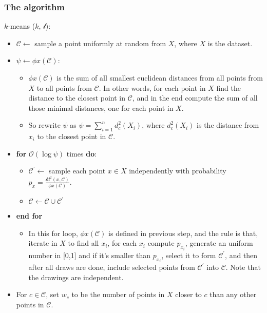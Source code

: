 \documentclass{article}
\begin{document}
\subsubsection{The algorithm}\label{the-algorithm}

$k$-means\textbar{}\textbar{} ($k$, $\mathscr{l}$):

\begin{itemize}
\itemsep1pt\parskip0pt
\item
  $\mathcal{C} \leftarrow$ sample a point uniformly at random from $X$,
  where $X$ is the dataset.
\item
  $\psi \leftarrow \phi x (\mathcal{C})$:

  \begin{itemize}
  \itemsep1pt\parskip0pt
  \item
    $\phi x (\mathcal{C})$ is the sum of all smallest euclidean
    distances from all points from $X$ to all points from $\mathcal{C}$.
    In other words, for each point in $X$ find the distance to the
    closest point in $\mathcal{C}$, and in the end compute the sum of
    all those minimal distances, one for each point in $X$.
  \item
    So rewrite $\psi$ as $\psi = \sum_{i = 1}^{n}d_{c}^{2}(X_{i})$,
    where $d_{c}^{2}(X_{i})$ is the distance from $x_{i}$ to the closest
    point in $\mathcal{C}$.
  \end{itemize}
\item
  \textbf{for} $\mathcal{O}(\log \psi)$ times \textbf{do}:

  \begin{itemize}
  \itemsep1pt\parskip0pt
  \item
    $\mathcal{C}^{'} \leftarrow$ sample each point $x \in X$
    independently with probability
    $p_{x} = \frac{\mathscr{l} d^{2}(x, \mathcal{C})}{\phi x (\mathcal{C})}$.
  \item
    $\mathcal{C} \leftarrow \mathcal{C} \cup \mathcal{C}^{'}$
  \end{itemize}
\item
  \textbf{end for}

  \begin{itemize}
  \itemsep1pt\parskip0pt
  \item
    In this for loop, $\phi x (\mathcal{C})$ is defined in previous
    step, and the rule is that, iterate in $X$ to find all $x_{i}$, for
    each $x_{i}$ compute $p_{x_{i}}$, generate an uniform number in
    {[}0,1{]} and if it's smaller than $p_{x_{i}}$, select it to form
    $\mathcal{C}^{'}$, and then after all draws are done, include
    selected points from $\mathcal{C}^{'}$ into $\mathcal{C}$. Note that
    the drawings are independent.
  \end{itemize}
\item
  For $c \in \mathcal{C}$, set $w_{c}$ to be the number of points in $X$
  closer to $c$ than any other points in $\mathcal{C}$.


\end{itemize}
\end{document}
